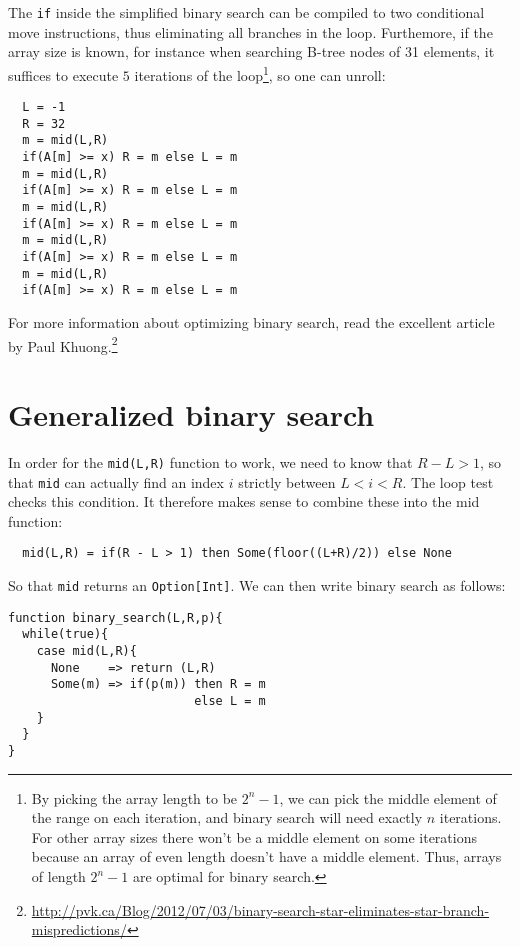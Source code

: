 \documentclass[a4paper, 11pt]{article}
\begin{document}
The \lstinline|if| inside the simplified binary search can be compiled to two conditional move instructions, thus eliminating all branches in the loop. Furthemore, if the array size is known, for instance when searching B-tree nodes of 31 elements, it suffices to execute $5$ iterations of the loop\footnote{By picking the array length to be $2^n - 1$, we can pick the middle element of the range on each iteration, and binary search will need exactly $n$ iterations. For other array sizes there won't be a middle element on some iterations because an array of even length doesn't have a middle element. Thus, arrays of length $2^n - 1$ are optimal for binary search.}, so one can unroll:

\begin{lstlisting}
  L = -1
  R = 32
  m = mid(L,R)
  if(A[m] >= x) R = m else L = m
  m = mid(L,R)
  if(A[m] >= x) R = m else L = m
  m = mid(L,R)
  if(A[m] >= x) R = m else L = m
  m = mid(L,R)
  if(A[m] >= x) R = m else L = m
  m = mid(L,R)
  if(A[m] >= x) R = m else L = m
\end{lstlisting}

\noindent For more information about optimizing binary search, read the excellent article by Paul Khuong.\footnote{\url{http://pvk.ca/Blog/2012/07/03/binary-search-star-eliminates-star-branch-mispredictions/}}

\section{Generalized binary search}

In order for the \lstinline|mid(L,R)| function to work, we need to know that $R-L>1$, so that \lstinline|mid| can actually find an index $i$ strictly between $L < i < R$. The loop test checks this condition. It therefore makes sense to combine these into the mid function:

\begin{lstlisting}
  mid(L,R) = if(R - L > 1) then Some(floor((L+R)/2)) else None
\end{lstlisting}

\noindent So that \lstinline|mid| returns an \lstinline|Option[Int]|. We can then write binary search as follows:

\begin{minipage}{\linewidth}
\begin{lstlisting}
function binary_search(L,R,p){
  while(true){
    case mid(L,R){
      None    => return (L,R)
      Some(m) => if(p(m)) then R = m
                          else L = m
    }
  }
}
\end{lstlisting}
\end{minipage}
\end{document}
